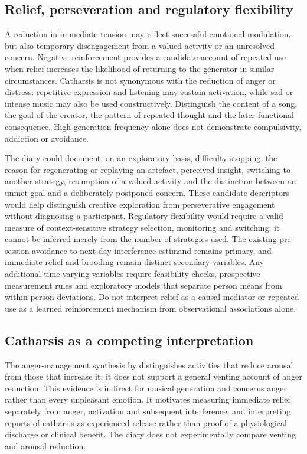 \documentclass[11pt]{article}
\begin{document}
\subsection{Relief, perseveration and regulatory flexibility}
A reduction in immediate tension may reflect successful emotional modulation, but also temporary disengagement from a valued activity or an unresolved concern. Negative reinforcement provides a candidate account of repeated use when relief increases the likelihood of returning to the generator in similar circumstances. Catharsis is not synonymous with the reduction of anger or distress: repetitive expression and listening may sustain activation, while sad or intense music may also be used constructively. Distinguish the content of a song, the goal of the creator, the pattern of repeated thought and the later functional consequence. High generation frequency alone does not demonstrate compulsivity, addiction or avoidance.

The diary could document, on an exploratory basis, difficulty stopping, the reason for regenerating or replaying an artefact, perceived insight, switching to another strategy, resumption of a valued activity and the distinction between an unmet goal and a deliberately postponed concern. These candidate descriptors would help distinguish creative exploration from perseverative engagement without diagnosing a participant. Regulatory flexibility would require a valid measure of context-sensitive strategy selection, monitoring and switching; it cannot be inferred merely from the number of strategies used. The existing pre-session avoidance to next-day interference estimand remains primary, and immediate relief and brooding remain distinct secondary variables. Any additional time-varying variables require feasibility checks, prospective measurement rules and exploratory models that separate person means from within-person deviations. Do not interpret relief as a causal mediator or repeated use as a learned reinforcement mechanism from observational associations alone.

\subsection{Catharsis as a competing interpretation}
The anger-management synthesis by \citet{kjaervik2024} distinguishes activities that reduce arousal from those that increase it; it does not support a general venting account of anger reduction. This evidence is indirect for musical generation and concerns anger rather than every unpleasant emotion. It motivates measuring immediate relief separately from anger, activation and subsequent interference, and interpreting reports of catharsis as experienced release rather than proof of a physiological discharge or clinical benefit. The diary does not experimentally compare venting and arousal reduction.
\end{document}
